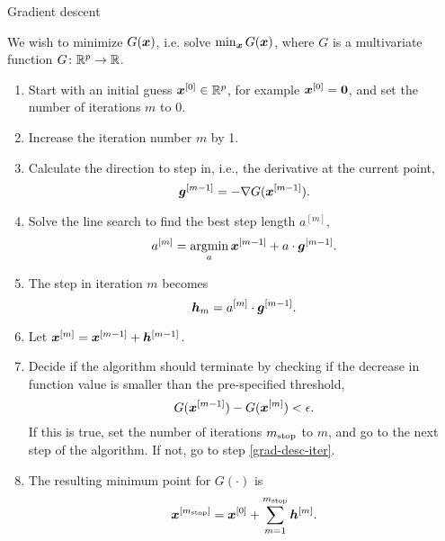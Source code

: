 \begin{algorithm}
\caption{Gradient descent}
\label{algo:grad-desc}
We wish to minimize $G(\bm{x})$, i.e. solve $\min_{\bm{x}}G(\bm{x})$, where $G$ is a multivariate function $G\colon\mathbb{R}^p\to\mathbb{R}$.
\begin{enumerate}
    \item
        Start with an initial guess $\bm{x}^{[0]}\in\mathbb{R}^p$, for example $\bm{x}^{[0]}=\bm{0}$, and set the number of iterations $m$ to 0.
    \item
        \label{grad-desc-iter}
        Increase the iteration number $m$ by 1.
    \item
        Calculate the direction to step in, i.e., the derivative at the current point,
        \begin{equation*}
            \bm{g}^{[m-1]}=-\nabla G(\bm{x}^{[m-1]}).
        \end{equation*}
    \item
        Solve the line search to find the best step length $a^{[m]}$,
        \begin{equation*}
            a^{[m]}=\operatorname*{argmin}_{a}\bm{x}^{[m-1]}+a\cdot\bm{g}^{[m-1]}.
        \end{equation*}
    \item
        The step in iteration $m$ becomes
        \begin{equation*}
            \bm{h}_m=a^{[m]}\cdot\bm{g}^{[m-1]}.
        \end{equation*}
    \item
        Let $\bm{x}^{[m]}=\bm{x}^{[m-1]}+\bm{h}^{[m-1]}$.
    \item
        Decide if the algorithm should terminate by checking if the decrease in function value is smaller than the pre-specified threshold,
        \begin{equation*}
            G(\bm{x}^{[m-1]})-G(\bm{x}^{[m]})<\epsilon.
        \end{equation*}
        If this is true, set the number of iterations $m_{\text{stop}}$ to $m$, and go to the next step of the algorithm.
        If not, go to step \ref{grad-desc-iter}.
    \item
        The resulting minimum point for $G(\cdot)$ is
        \begin{equation*}
            \bm{x}^{[m_{\text{stop}}]}=\bm{x}^{[0]}+\sum_{m=1}^{m_{\text{stop}}}\bm{h}^{[m]}.
        \end{equation*}
\end{enumerate}
\end{algorithm}

